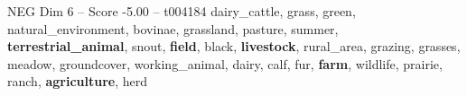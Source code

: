 \begin{textsample}{NEG Dim 6 – Score -5.00 – t004184}  \label{ex:f6_neg_038}
dairy\_cattle, grass, green, natural\_environment, bovinae, grassland, pasture, summer, \textbf{terrestrial\_animal}, snout, \textbf{field}, black, \textbf{livestock}, rural\_area, grazing, grasses, meadow, groundcover, working\_animal, dairy, calf, fur, \textbf{farm}, wildlife, prairie, ranch, \textbf{agriculture}, herd

\end{textsample}
